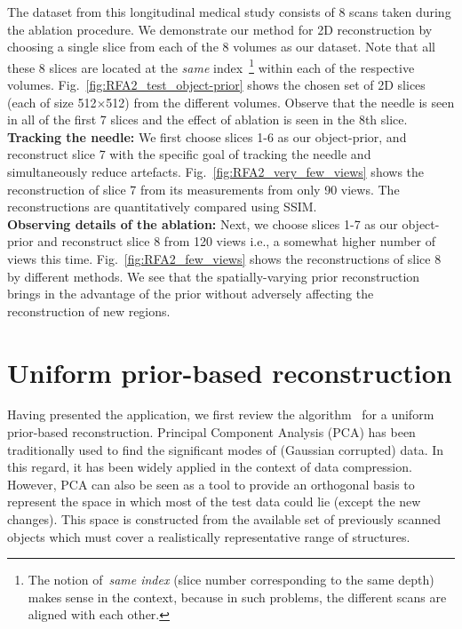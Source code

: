 \documentclass[journal]{IEEEtran}
\begin{document}
The dataset from this longitudinal medical study consists of 8 scans
taken during the ablation procedure. We demonstrate our method for 2D
reconstruction by choosing a single slice from each of the 8 volumes
as our dataset. Note that all these 8 slices are located at the
\emph{same} index~\footnote{The notion of~\textit{same index} (slice
  number corresponding to the same depth) makes sense in the context,
  because in such problems, the different scans are aligned with each
  other.} within each of the respective
volumes. Fig.~\ref{fig:RFA2_test_object-prior} shows the chosen set of
2D slices (each of size 512$\times$512) from the different
volumes. Observe that the needle is seen in all of the first 7 slices
and the effect of ablation is seen in the 8th slice. \\

\textbf{Tracking the needle:} We first choose slices 1-6 as our
object-prior, and reconstruct slice 7 with the specific goal of
tracking the needle and simultaneously reduce
artefacts. Fig.~\ref{fig:RFA2_very_few_views} shows the reconstruction
of slice 7 from its measurements from only 90 views. The
reconstructions are quantitatively compared using SSIM.\\

\textbf{Observing details of the ablation:} Next, we choose slices 1-7 as our object-prior and reconstruct slice 8 from 120 views i.e., a somewhat higher number of views this time. Fig.~\ref{fig:RFA2_few_views} shows the reconstructions of slice 8 by different methods. We see that the spatially-varying prior reconstruction brings in the advantage of the prior without adversely affecting the reconstruction of new regions.

\section{Uniform prior-based reconstruction}
\label{sec:method_uniform_prior}
Having presented the application, we first review the algorithm~\cite{my_dicta_paper} for a uniform  prior-based reconstruction. Principal Component Analysis (PCA) has been traditionally used to find the significant modes of (Gaussian corrupted) data. In this regard, it has been widely applied in the context of data compression. However, PCA can also be seen as a tool to provide an orthogonal basis to represent the space in which most of the test data could lie (except the new changes). This space is constructed from the available set of previously scanned objects which must cover a realistically representative range of structures. %
\end{document}
